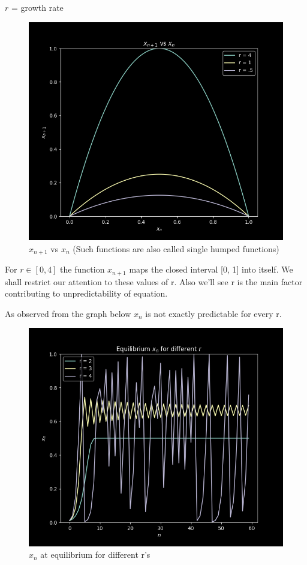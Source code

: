 \documentclass{report}
\begin{document}
$r$ = growth rate

\begin{figure}[!h]
    \centering
    \includegraphics[scale=.5]{images/xnvsnp1.png}
    \caption{$x_{n+1}$ vs $x_n$ (Such functions are also called single humped functions)}
    \label{fig:my_label}
\end{figure}

For $r \in [0, 4]$ the function $x_{n+1}$ maps the closed interval [0, 1] into itself. We shall
restrict our attention to these values of r. Also we'll see r is the main factor contributing to unpredictability of equation.

As observed from the graph below $x_{n}$ is not exactly predictable for every r.




\begin{figure}[!h]
    \centering
    \includegraphics[scale=.4]{images/eqfordifr.png}
    \caption{$x_n$ at equilibrium for different r's}
    \label{fig:my_label2}
\end{figure}
\end{document}
